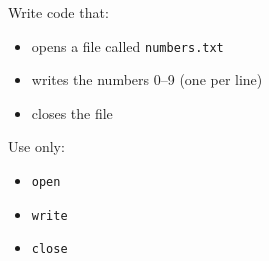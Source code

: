 \begin{questions}
	Write code that:

	\begin{itemize}
		\item opens a file called \texttt{numbers.txt}
		\item writes the numbers 0--9 (one per line)
		\item closes the file
	\end{itemize}

	Use only:

	\begin{itemize}
		\item \texttt{open}
		\item \texttt{write}
		\item \texttt{close}
	\end{itemize}

	\vspace{7cm}

\end{questions}

